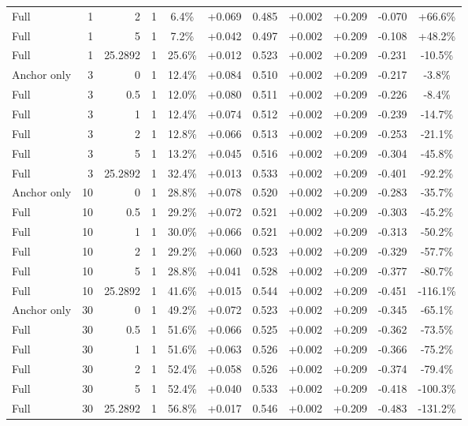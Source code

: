 \begin{table}[htbp]
\begin{tabular}{lrrrccccccc}
Full & 1 & 2 & 1 & 6.4\% & +0.069 & 0.485 & +0.002 & +0.209 & -0.070 & +66.6\% \\
Full & 1 & 5 & 1 & 7.2\% & +0.042 & 0.497 & +0.002 & +0.209 & -0.108 & +48.2\% \\
Full & 1 & 25.2892 & 1 & 25.6\% & +0.012 & 0.523 & +0.002 & +0.209 & -0.231 & -10.5\% \\
Anchor only & 3 & 0 & 1 & 12.4\% & +0.084 & 0.510 & +0.002 & +0.209 & -0.217 & -3.8\% \\
Full & 3 & 0.5 & 1 & 12.0\% & +0.080 & 0.511 & +0.002 & +0.209 & -0.226 & -8.4\% \\
Full & 3 & 1 & 1 & 12.4\% & +0.074 & 0.512 & +0.002 & +0.209 & -0.239 & -14.7\% \\
Full & 3 & 2 & 1 & 12.8\% & +0.066 & 0.513 & +0.002 & +0.209 & -0.253 & -21.1\% \\
Full & 3 & 5 & 1 & 13.2\% & +0.045 & 0.516 & +0.002 & +0.209 & -0.304 & -45.8\% \\
Full & 3 & 25.2892 & 1 & 32.4\% & +0.013 & 0.533 & +0.002 & +0.209 & -0.401 & -92.2\% \\
Anchor only & 10 & 0 & 1 & 28.8\% & +0.078 & 0.520 & +0.002 & +0.209 & -0.283 & -35.7\% \\
Full & 10 & 0.5 & 1 & 29.2\% & +0.072 & 0.521 & +0.002 & +0.209 & -0.303 & -45.2\% \\
Full & 10 & 1 & 1 & 30.0\% & +0.066 & 0.521 & +0.002 & +0.209 & -0.313 & -50.2\% \\
Full & 10 & 2 & 1 & 29.2\% & +0.060 & 0.523 & +0.002 & +0.209 & -0.329 & -57.7\% \\
Full & 10 & 5 & 1 & 28.8\% & +0.041 & 0.528 & +0.002 & +0.209 & -0.377 & -80.7\% \\
Full & 10 & 25.2892 & 1 & 41.6\% & +0.015 & 0.544 & +0.002 & +0.209 & -0.451 & -116.1\% \\
Anchor only & 30 & 0 & 1 & 49.2\% & +0.072 & 0.523 & +0.002 & +0.209 & -0.345 & -65.1\% \\
Full & 30 & 0.5 & 1 & 51.6\% & +0.066 & 0.525 & +0.002 & +0.209 & -0.362 & -73.5\% \\
Full & 30 & 1 & 1 & 51.6\% & +0.063 & 0.526 & +0.002 & +0.209 & -0.366 & -75.2\% \\
Full & 30 & 2 & 1 & 52.4\% & +0.058 & 0.526 & +0.002 & +0.209 & -0.374 & -79.4\% \\
Full & 30 & 5 & 1 & 52.4\% & +0.040 & 0.533 & +0.002 & +0.209 & -0.418 & -100.3\% \\
Full & 30 & 25.2892 & 1 & 56.8\% & +0.017 & 0.546 & +0.002 & +0.209 & -0.483 & -131.2\% \\

\end{tabular}
\end{table}
